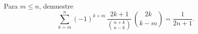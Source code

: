 Para \(m\le n\), demuestre
\[\sum_{k=m}^n (-1)^{k+m}\,\frac{2k+1}{\binom{n+k}{n-k}}\,
  \binom{2k}{k-m}
  = \frac{1}{2n+1}.\]
